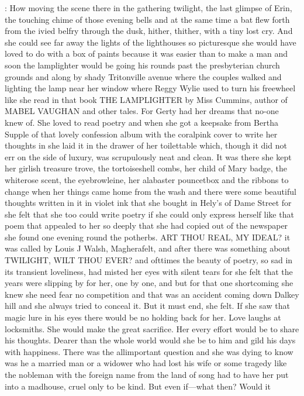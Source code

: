 :
How moving the scene there in the gathering twilight, the last glimpse of
Erin, the touching chime of those evening bells and at the same time a bat
flew forth from the ivied belfry through the dusk, hither, thither, with a
tiny lost cry. And she could see far away the lights of the lighthouses so
picturesque she would have loved to do with a box of paints because it was
easier than to make a man and soon the lamplighter would be going his
rounds past the presbyterian church grounds and along by shady
Tritonville avenue where the couples walked and lighting the lamp near her
window where Reggy Wylie used to turn his freewheel like she read in that
book THE LAMPLIGHTER by Miss Cummins, author of MABEL VAUGHAN and
other tales. For Gerty had her dreams that no-one knew of. She loved to
read poetry and when she got a keepsake from Bertha Supple of that lovely
confession album with the coralpink cover to write her thoughts in she
laid it in the drawer of her toilettable which, though it did not err
on the side of luxury, was scrupulously neat and clean. It was there
she kept her girlish treasure trove, the tortoiseshell combs, her
child of Mary badge, the whiterose scent, the eyebrowleine, her
alabaster pouncetbox and the ribbons to change when her things came
home from the wash and there were some beautiful thoughts written
in it in violet ink that she bought in Hely's of Dame Street for
she felt that she too could write poetry if she could only express
herself like that poem that appealed to her so deeply that she had
copied out of the newspaper she found one evening round the potherbs. ART
THOU REAL, MY IDEAL? it was called by Louis J Walsh, Magherafelt, and
after there was something about TWILIGHT, WILT THOU EVER? and ofttimes
the beauty of poetry, so sad in its transient loveliness, had misted
her eyes with silent tears for she felt that the years were slipping
by for her, one by one, and but for that one shortcoming she knew she
need fear no competition and that was an accident coming down Dalkey
hill and she always tried to conceal it. But it must end, she felt.
If she saw that magic lure in his eyes there would be no holding
back for her. Love laughs at locksmiths. She would make the great
sacrifice. Her every effort would be to share his thoughts. Dearer than
the whole world would she be to him and gild his days with happiness.
There was the allimportant question and she was dying to know was he a
married man or a widower who had lost his wife or some tragedy like the
nobleman with the foreign name from the land of song had to have her put
into a madhouse, cruel only to be kind. But even if—what then? Would it
